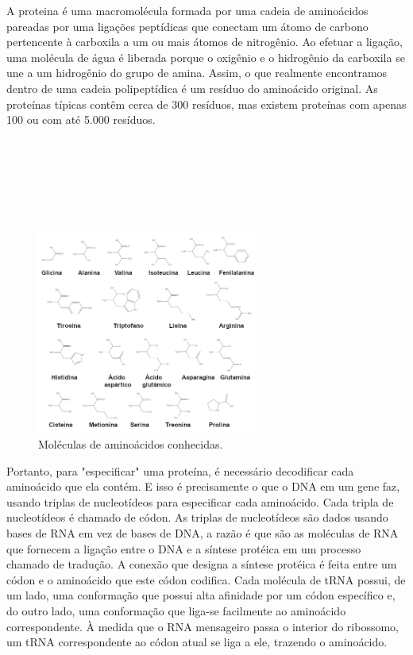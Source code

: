 A proteina é uma macromolécula formada por uma cadeia de aminoácidos pareadas por uma ligações peptídicas que conectam um átomo de carbono pertencente à carboxila a um ou mais átomos de nitrogênio. Ao efetuar a ligação, uma molécula de água é liberada porque o oxigênio e o hidrogênio da carboxila se une a um hidrogênio do grupo de amina. Assim, o que realmente encontramos dentro de uma cadeia polipeptídica é um resíduo do aminoácido original. As proteínas típicas contêm cerca de 300 resíduos, mas existem proteínas com apenas 100 ou com até 5.000 resíduos. \cite{nucleic-acid}
\\ \\ \\ \\ \\ \\ \\ 
\begin{figure}[h]
    \centering
    \includegraphics[width=0.65\textwidth]{images/aminoacidos.jpg}
    \caption{Moléculas de aminoácidos conhecidas.}
    \label{fig:aminoacidos}
\end{figure}

Portanto, para "especificar" uma proteína, é necessário decodificar cada aminoácido que ela contém. E isso é precisamente o que o DNA em um gene faz, usando triplas de nucleotídeos para especificar cada aminoácido. Cada tripla de nucleotídeos é chamado de códon. As triplas de nucleotídeos são dados usando bases de RNA em vez de bases de DNA, a razão é que são as moléculas de RNA que fornecem a ligação entre o DNA e a síntese protéica em um processo chamado de tradução. A conexão que designa a síntese protéica é feita entre um códon e o aminoácido que este códon codifica. Cada molécula de tRNA possui, de um lado, uma conformação que possui alta afinidade por um códon específico e, do outro lado, uma conformação que liga-se facilmente ao aminoácido correspondente. À medida que o RNA mensageiro passa o interior do ribossomo, um tRNA correspondente ao códon atual se liga a ele, trazendo o aminoácido. \cite{bio-info}

